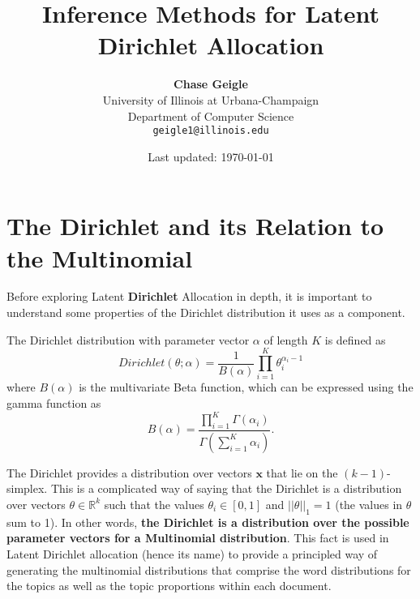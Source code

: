 \documentclass[11pt]{article}
\begin{document}
\onehalfspacing
\title{Inference Methods for Latent Dirichlet Allocation}
\date{Last updated: \today}
\author{%
    \Large{\textbf{Chase Geigle}}\\
    University of Illinois at Urbana-Champaign\\
    Department of Computer Science\\
    \texttt{geigle1@illinois.edu}
}
\maketitle


\section{The Dirichlet and its Relation to the Multinomial}

Before exploring Latent \textbf{Dirichlet} Allocation in depth, it is
important to understand some properties of the Dirichlet distribution it
uses as a component.

The Dirichlet distribution with parameter vector $\alpha$ of length $K$ is
defined as
\begin{equation}
  Dirichlet(\theta; \alpha) = \frac{1}{B(\alpha)} \prod_{i=1}^K
  \theta_i^{\alpha_i - 1}
  \label{eqn:dirichlet-pdf}
\end{equation}
where $B(\alpha)$ is the multivariate Beta function, which can be expressed
using the gamma function as
\begin{equation}
  B(\alpha) = \frac{\prod_{i=1}^K
  \Gamma(\alpha_i)}{\Gamma\left(\sum_{i=1}^K \alpha_i\right)}.
\end{equation}

The Dirichlet provides a distribution over vectors $\mathbf{x}$ that lie on
the $(k-1)$-simplex. This is a complicated way of saying that the Dirichlet
is a distribution over vectors $\theta \in \mathbb{R}^k$ such that the
values $\theta_i \in [0,1]$ and $||\theta||_1 = 1$ (the values in $\theta$
sum to 1). In other words, \textbf{the Dirichlet is a distribution over the
possible parameter vectors for a Multinomial distribution}. This fact is
used in Latent Dirichlet allocation (hence its name) to provide a
principled way of generating the multinomial distributions that comprise
the word distributions for the topics as well as the topic proportions
within each document.
\end{document}
